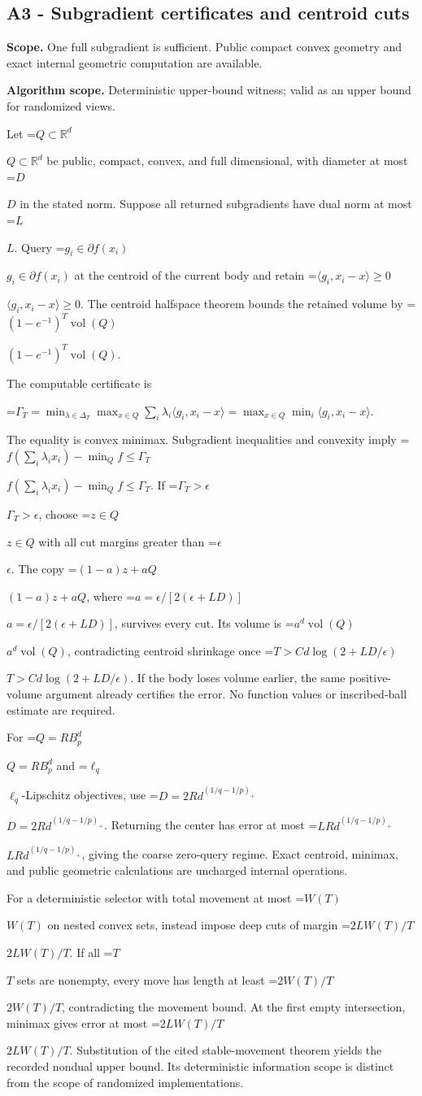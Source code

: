 \documentclass[10pt,a4paper]{article}
\newcommand{\AtlasMath}[1]{\par\begingroup\centering\setbox0=\hbox{$\displaystyle #1$}\ifdim\wd0>1.4\linewidth\typeout{ATLAS WIDE FORMULA: \the\wd0}\fi\ifdim\wd0>\linewidth\resizebox{\linewidth}{!}{\box0}\else\box0\fi\par\endgroup}
\newcommand{\AtlasInlineMath}[1]{\begingroup\setbox0=\hbox{$#1$}\ifdim\wd0>.4\linewidth\endgroup\AtlasMath{#1}\else\endgroup$#1$\fi}
\begin{document}
\subsection{A3 - Subgradient certificates and centroid cuts}
\textbf{Scope.} One full subgradient is sufficient. Public compact convex geometry and exact internal geometric computation are available.

\textbf{Algorithm scope.} Deterministic upper-bound witness; valid as an upper bound for randomized views.

Let \AtlasInlineMath{Q\subset\mathbb R^d} be public, compact, convex, and full dimensional, with diameter at most \AtlasInlineMath{D} in the stated norm. Suppose all returned subgradients have dual norm at most \AtlasInlineMath{L}. Query \AtlasInlineMath{g_i\in\partial f(x_i)} at the centroid of the current body and retain \AtlasInlineMath{\langle g_i,x_i-x\rangle\ge0}. The centroid halfspace theorem bounds the retained volume by \AtlasInlineMath{(1-e^{-1})^T\operatorname{vol}(Q)}.

The computable certificate is

\AtlasMath{\Gamma_T=\min_{\lambda\in\Delta_T}\max_{x\in Q}\sum_i\lambda_i\langle g_i,x_i-x\rangle
=\max_{x\in Q}\min_i\langle g_i,x_i-x\rangle.}

The equality is convex minimax. Subgradient inequalities and convexity imply
\AtlasInlineMath{f(\sum_i\lambda_ix_i)-\min_Qf\le\Gamma_T}.
If \AtlasInlineMath{\Gamma_T>\epsilon}, choose \AtlasInlineMath{z\in Q} with all cut margins greater than \AtlasInlineMath{\epsilon}. The copy \AtlasInlineMath{(1-a)z+aQ}, where \AtlasInlineMath{a=\epsilon/[2(\epsilon+LD)]}, survives every cut. Its volume is \AtlasInlineMath{a^d\operatorname{vol}(Q)}, contradicting centroid shrinkage once \AtlasInlineMath{T>C d\log(2+LD/\epsilon)}. If the body loses volume earlier, the same positive-volume argument already certifies the error. No function values or inscribed-ball estimate are required.

For \AtlasInlineMath{Q=RB_p^d} and \AtlasInlineMath{\ell_q}-Lipschitz objectives, use \AtlasInlineMath{D=2Rd^{(1/q-1/p)_+}}. Returning the center has error at most \AtlasInlineMath{LRd^{(1/q-1/p)_+}}, giving the coarse zero-query regime. Exact centroid, minimax, and public geometric calculations are uncharged internal operations.

For a deterministic selector with total movement at most \AtlasInlineMath{W(T)} on nested convex sets, instead impose deep cuts of margin \AtlasInlineMath{2LW(T)/T}. If all \AtlasInlineMath{T} sets are nonempty, every move has length at least \AtlasInlineMath{2W(T)/T}, contradicting the movement bound. At the first empty intersection, minimax gives error at most \AtlasInlineMath{2LW(T)/T}. Substitution of the cited stable-movement theorem yields the recorded nondual upper bound. Its deterministic information scope is distinct from the scope of randomized implementations.
\end{document}
